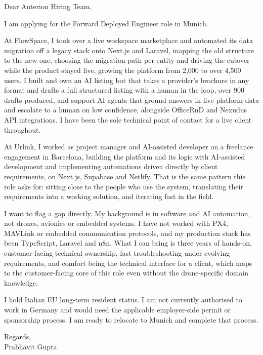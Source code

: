 \documentclass[a4paper,11pt]{article}
\begin{document}
Dear Auterion Hiring Team,

I am applying for the Forward Deployed Engineer role in Munich.

At FlowSpace, I took over a live workspace marketplace and automated its data migration off a legacy stack onto Next.js and Laravel, mapping the old structure to the new one, choosing the migration path per entity and driving the cutover while the product stayed live, growing the platform from 2,000 to over 4,500 users. I built and own an AI listing bot that takes a provider's brochure in any format and drafts a full structured listing with a human in the loop, over 900 drafts produced, and support AI agents that ground answers in live platform data and escalate to a human on low confidence, alongside OfficeRnD and Nexudus API integrations. I have been the sole technical point of contact for a live client throughout.

At Urlink, I worked as project manager and AI-assisted developer on a freelance engagement in Barcelona, building the platform and its logic with AI-assisted development and implementing automations driven directly by client requirements, on Next.js, Supabase and Netlify. That is the same pattern this role asks for: sitting close to the people who use the system, translating their requirements into a working solution, and iterating fast in the field.

I want to flag a gap directly. My background is in software and AI automation, not drones, avionics or embedded systems. I have not worked with PX4, MAVLink or embedded communication protocols, and my production stack has been TypeScript, Laravel and n8n. What I can bring is three years of hands-on, customer-facing technical ownership, fast troubleshooting under evolving requirements, and comfort being the technical interface for a client, which maps to the customer-facing core of this role even without the drone-specific domain knowledge.

I hold Italian EU long-term resident status. I am not currently authorised to work in Germany and would need the applicable employer-side permit or sponsorship process. I am ready to relocate to Munich and complete that process.

Regards,\\
Prabhavit Gupta
\end{document}
